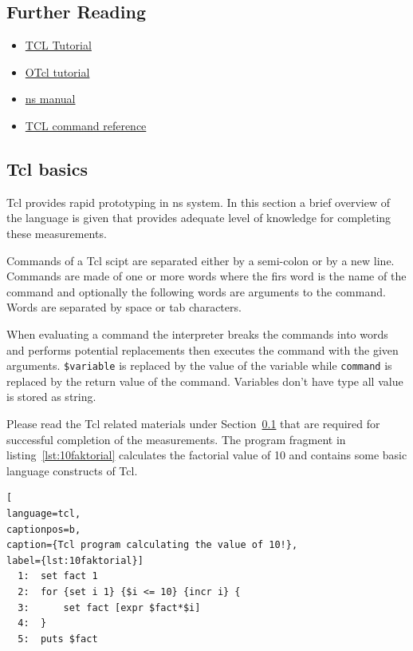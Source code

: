 \documentclass[a4paper]{article}
\begin{document}
\subsection{Further Reading}\label{sec:tcl}
\begin{itemize}
    \item \href{https://www.tcl.tk/man/tcl8.5/tutorial/tcltutorial.html}{TCL Tutorial}
    \item \href{https://www.isi.edu/nsnam/otcl/doc/tutorial.html}{OTcl tutorial}
    \item \href{http://www.isi.edu/nsnam/ns/ns-documentation.html}{ns manual}
    \item \href{http://alpha.tmit.bme.hu/meresek/tcl2.pdf}{TCL command reference}
\end{itemize}

\subsection{Tcl basics}

Tcl provides rapid prototyping in ns system. In this section a brief overview of the language is given that provides
adequate level of knowledge for completing these measurements.

Commands of a Tcl scipt are separated either by a semi-colon or by a new line. Commands are made of one or more words
where the firs word is the name of the command and optionally the following words are arguments to the command. Words
are separated by space or tab characters.

When evaluating a command the interpreter breaks the commands into words and performs potential replacements then
executes the command with the given arguments. \verb!$variable! is replaced by the value of the variable while
\verb!command! is replaced by the return value of the command. Variables don't have type all value is stored as
string.

Please read the Tcl related materials under Section~\ref{sec:tcl} that are required for successful completion of the
measurements. The program fragment in listing~\ref{lst:10faktorial} calculates the factorial value of 10 and contains some
basic language constructs of Tcl.

\begin{lstlisting}[
language=tcl,
captionpos=b,
caption={Tcl program calculating the value of 10!},
label={lst:10faktorial}]
  1:  set fact 1
  2:  for {set i 1} {$i <= 10} {incr i} {
  3:      set fact [expr $fact*$i]
  4:  }
  5:  puts $fact
\end{lstlisting}
\end{document}
